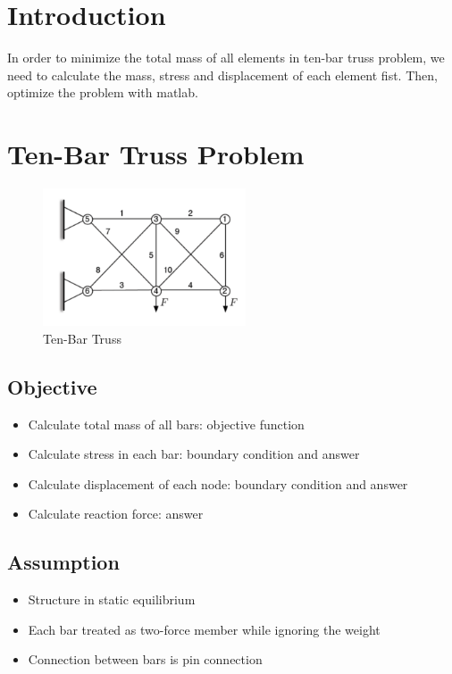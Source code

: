 \documentclass[12pt, a4paper]{article}
\begin{document}
\cfoot{\thepage}


\tableofcontents\thispagestyle{fancy}

\section{Introduction}
In order to minimize the total mass of all elements in ten-bar truss problem, we need to calculate the mass, stress and displacement of each element fist. Then, optimize the problem with matlab.

\section{Ten-Bar Truss Problem}
    \begin{figure}[h]
	\centering
	\includegraphics[width=6cm]{./pics/ten-bar truss.png}
	\caption{Ten-Bar Truss  \cite{homework}}
	\label{ten-bar truss}
	\end{figure}
	
\subsection*{Objective}
\begin{itemize}
    \item Calculate total mass of all bars: objective function
    \item Calculate stress in each bar: boundary condition and answer
    \item Calculate displacement of each node: boundary condition and answer
    \item Calculate reaction force: answer
\end{itemize}

\subsection*{Assumption}
\begin{itemize}
    \item Structure in static equilibrium
    \item Each bar treated as two-force member while ignoring the weight
    \item Connection between bars is pin connection
\end{itemize}
\end{document}
